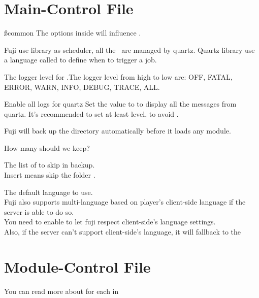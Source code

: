 \section{Main-Control File}

\ss{common}
The  options inside  will influence .

Fuji use  library as scheduler, all the~ are managed by quartz.
Quartz library use a language called  to define when to trigger a job.

The logger level for .The logger level from high to low are: OFF, FATAL, ERROR, WARN, INFO, DEBUG, TRACE, ALL.

\begin{example}{Enable all logs for quartz}
    Set the value to  to display all the messages from quartz.
    It's recommended to set at least  level, to avoid .
\end{example}

Fuji will back up the  directory automatically before it loads any module.

How many  should we keep?

The list of  to skip in backup.
\\
Insert  means skip the folder .

The default language to use.
\\
Fuji also supports multi-language based on player's client-side language if the server is able to do so.
\\
You need to enable  to let fuji respect client-side's language settings.
\\
Also, if the server can't support client-side's language, it will fallback to the 



\clearpage
\section{Module-Control File}
You can read more about  for each  in 